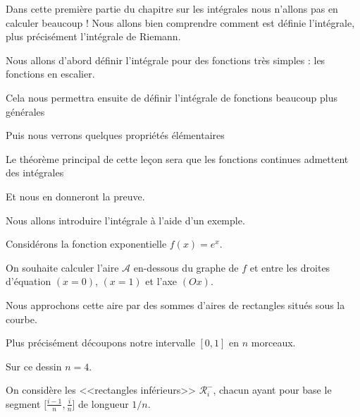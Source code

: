 







\debuttexte

\diapo

\change

Dans cette première partie du chapitre sur les intégrales nous n'allons pas en calculer beaucoup !
Nous allons bien comprendre comment est définie l'intégrale, plus précisément l'intégrale de Riemann.


\change

Nous allons d'abord définir l'intégrale pour des fonctions très simples : les fonctions en escalier.

\change

Cela nous permettra ensuite de définir l'intégrale de fonctions beaucoup plus générales

\change

Puis nous verrons quelques propriétés élémentaires

\change

Le théorème principal de cette leçon sera que les fonctions continues admettent des intégrales

\change

Et nous en donneront la preuve.

\diapo



Nous allons introduire l'intégrale à l'aide d'un exemple.

Considérons la fonction exponentielle $f(x)=e^x$. 


\change


On souhaite calculer
l'aire $\mathcal{A}$ en-dessous du graphe de $f$ et 
entre les droites d'équation $(x=0)$, $(x=1)$ et l'axe $(O x)$.


\change


Nous approchons cette aire par des sommes d'aires de rectangles situés sous la courbe. 


Plus précisément découpons notre intervalle $[0,1]$ en $n$ morceaux.

Sur ce dessin $n=4$.


On considère les <<rectangles inférieurs>> $\mathcal{R}_i^-$, 
chacun ayant pour base le segment $\big[\frac{i-1}{n},\frac{i}{n}\big]$ de longueur $1/n$.

